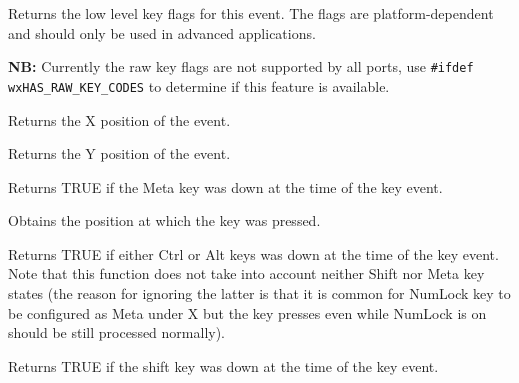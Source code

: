 
Returns the low level key flags for this event. The flags are
platform-dependent and should only be used in advanced applications.

{\bf NB:} Currently the raw key flags are not supported by all ports, use
{\tt \#ifdef wxHAS\_RAW\_KEY\_CODES} to determine if this feature is available.



Returns the X position of the event.



Returns the Y position of the event.



Returns TRUE if the Meta key was down at the time of the key event.




Obtains the position at which the key was pressed.



Returns TRUE if either {\sc Ctrl} or {\sc Alt} keys was down
at the time of the key event. Note that this function does not take into
account neither {\sc Shift} nor {\sc Meta} key states (the reason for ignoring
the latter is that it is common for {\sc NumLock} key to be configured as
{\sc Meta} under X but the key presses even while {\sc NumLock} is on should
be still processed normally).

\label{wxkeyeventshiftdown}


Returns TRUE if the shift key was down at the time of the key event.

